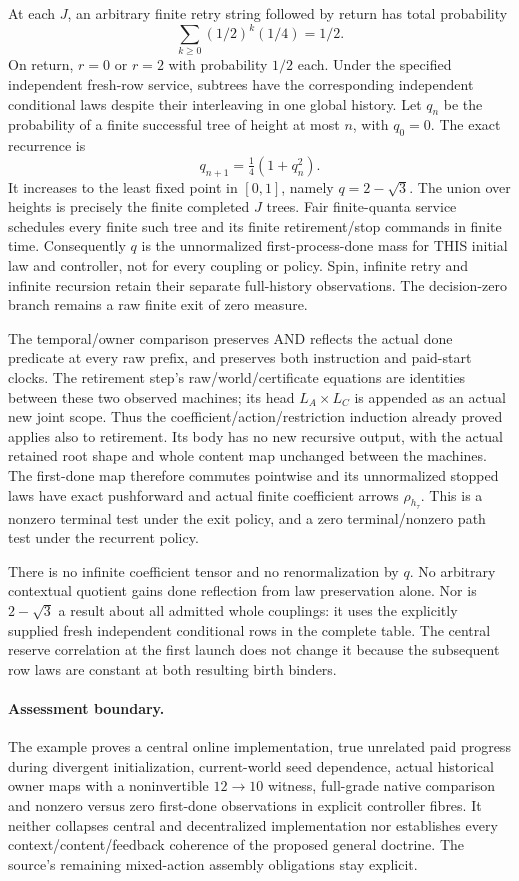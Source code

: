 \documentclass[11pt]{article}
\begin{document}
At each $J$, an arbitrary finite retry string followed by return has total probability
\[
 \sum_{k\geq0}(1/2)^k(1/4)=1/2.
\]
On return, $r=0$ or $r=2$ with probability $1/2$ each. Under the specified independent fresh-row service, subtrees have the corresponding independent conditional laws despite their interleaving in one global history. Let $q_n$ be the probability of a finite successful tree of height at most $n$, with $q_0=0$. The exact recurrence is
\[
 q_{n+1}=\tfrac14(1+q_n^2).
\]
It increases to the least fixed point in $[0,1]$, namely $q=2-\sqrt3$. The union over heights is precisely the finite completed $J$ trees. Fair finite-quanta service schedules every finite such tree and its finite retirement/stop commands in finite time. Consequently $q$ is the unnormalized first-process-done mass for THIS initial law and controller, not for every coupling or policy. Spin, infinite retry and infinite recursion retain their separate full-history observations. The decision-zero branch remains a raw finite exit of zero measure.

The temporal/owner comparison preserves AND reflects the actual done predicate at every raw prefix, and preserves both instruction and paid-start clocks. The retirement step's raw/world/certificate equations are identities between these two observed machines; its head $L_A\times L_C$ is appended as an actual new joint scope. Thus the coefficient/action/restriction induction already proved applies also to retirement. Its body has no new recursive output, with the actual retained root shape and whole content map unchanged between the machines. The first-done map therefore commutes pointwise and its unnormalized stopped laws have exact pushforward and actual finite coefficient arrows $\rho_{h_\tau}$. This is a nonzero terminal test under the exit policy, and a zero terminal/nonzero path test under the recurrent policy.

There is no infinite coefficient tensor and no renormalization by $q$. No arbitrary contextual quotient gains done reflection from law preservation alone. Nor is $2-\sqrt3$ a result about all admitted whole couplings: it uses the explicitly supplied fresh independent conditional rows in the complete table. The central reserve correlation at the first launch does not change it because the subsequent row laws are constant at both resulting birth binders.

\paragraph{Assessment boundary.}
The example proves a central online implementation, true unrelated paid progress during divergent initialization, current-world seed dependence, actual historical owner maps with a noninvertible $12\to10$ witness, full-grade native comparison and nonzero versus zero first-done observations in explicit controller fibres. It neither collapses central and decentralized implementation nor establishes every context/content/feedback coherence of the proposed general doctrine. The source's remaining mixed-action assembly obligations stay explicit.
\end{document}
